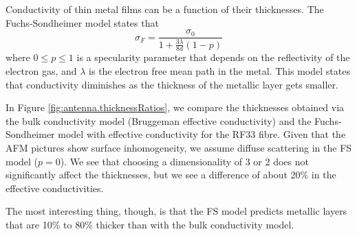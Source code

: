 Conductivity 
of thin metal films can be a function of their thicknesses. 
The Fuchs-Sondheimer model states
that
  \begin{equation}
      \sigma_F = \frac{\sigma_0}{1+\frac{3\lambda}{8d}\left(1-p\right)}
  \end{equation}
where $0\leq p\leq1$ is a specularity parameter that depends on the 
reflectivity of the electron gas, and $\lambda$ is the 
electron free mean path in the metal. This model states that conductivity
diminishes as the thickness of the metallic layer gets smaller.

In Figure \ref{fig:antenna.thicknessRatios}, we compare the 
thicknesses obtained via the bulk conductivity model (Bruggeman 
effective conductivity) and the Fuchs-Sondheimer model with 
effective conductivity for the RF33 fibre. Given that the AFM pictures
show surface inhomogeneity, we assume diffuse scattering in 
the FS model ($p=0$). We see that choosing a dimensionality 
of 3 or 2 does not significantly affect the thicknesses, but
we see a difference of about 20\% in the effective conductivities.

The most interesting thing, though, is that the FS
model predicts metallic layers that are 10\% to 80\% thicker 
than with the bulk conductivity model. 

